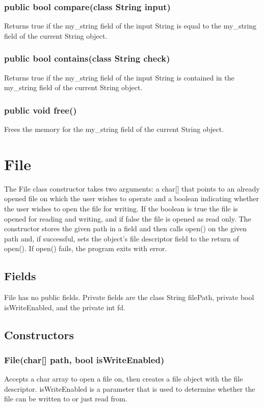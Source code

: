 \begin{homeworkProblem}
    \subsubsection{public bool compare(class String input)}
    Returns true if the my\_string field of the input String is equal to the my\_string field of the current String object.
    \subsubsection{public bool contains(class String check)}
    Returns true if the my\_string field of the input String is contained in the my\_string field of the current String object.
    \subsubsection{public void free()}
    Frees the memory for the my\_string field of the current String object.

	\section{File}
	The File class constructor takes two arguments: a char[] that points to an already opened file on which the user wishes to operate and a boolean indicating whether the user wishes to open the file for writing. If the boolean is true the file is opened for reading and writing, and if false the file is opened as read only. The constructor stores the given path in a field and then calls open() on the given path and, if successful, sets the object’s file descriptor field to the return of open(). If open() fails, the program exits with error.
	\subsection{Fields}
	File has no public fields. Private fields are the class String filePath, private bool isWriteEnabled, and the private int fd.

	\subsection{Constructors}
	\subsubsection{File(char[] path, bool isWriteEnabled)}
	Accepts a char array to open a file on, then creates a file object with the file descriptor. isWriteEnabled is a parameter that is used to determine whether the file can be written to or just read from.


\end{homeworkProblem}
